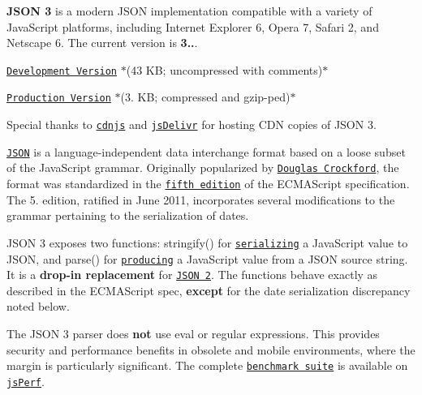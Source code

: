 

\href{http://travis-ci.org/bestiejs/json3}{\tt }

{\bfseries J\+S\+ON 3} is a modern J\+S\+ON implementation compatible with a variety of Java\+Script platforms, including Internet Explorer 6, Opera 7, Safari 2, and Netscape 6. The current version is {\bfseries 3..}.


\begin{DoxyItemize}
\item \href{http://cdnjs.cloudflare.com/ajax/libs/json3/3.3.2/json3.js}{\tt Development Version} $\ast$(43 KB; uncompressed with comments)$\ast$
\item \href{http://cdnjs.cloudflare.com/ajax/libs/json3/3.3.2/json3.min.js}{\tt Production Version} $\ast$(3. KB; compressed and {\ttfamily gzip}-\/ped)$\ast$
\end{DoxyItemize}

Special thanks to \href{http://cdnjs.com/libraries/json3/}{\tt cdnjs} and \href{http://www.jsdelivr.com/#!json3}{\tt js\+Delivr} for hosting C\+DN copies of J\+S\+ON 3.

\href{http://json.org/}{\tt J\+S\+ON} is a language-\/independent data interchange format based on a loose subset of the Java\+Script grammar. Originally popularized by \href{http://www.crockford.com/}{\tt Douglas Crockford}, the format was standardized in the \href{http://es5.github.com/}{\tt fifth edition} of the E\+C\+M\+A\+Script specification. The 5. edition, ratified in June 2011, incorporates several modifications to the grammar pertaining to the serialization of dates.

J\+S\+ON 3 exposes two functions\+: {\ttfamily stringify()} for \href{https://developer.mozilla.org/en/JavaScript/Reference/Global_Objects/JSON/stringify}{\tt serializing} a Java\+Script value to J\+S\+ON, and {\ttfamily parse()} for \href{https://developer.mozilla.org/en/JavaScript/Reference/Global_Objects/JSON/parse}{\tt producing} a Java\+Script value from a J\+S\+ON source string. It is a {\bfseries drop-\/in replacement} for \href{http://json.org/js}{\tt J\+S\+ON 2}. The functions behave exactly as described in the E\+C\+M\+A\+Script spec, {\bfseries except} for the date serialization discrepancy noted below.

The J\+S\+ON 3 parser does {\bfseries not} use {\ttfamily eval} or regular expressions. This provides security and performance benefits in obsolete and mobile environments, where the margin is particularly significant. The complete \href{http://jsperf.com/json3}{\tt benchmark suite} is available on \href{http://jsperf.com/}{\tt js\+Perf}.

